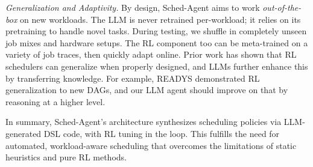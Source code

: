 \emph{Generalization and Adaptivity.} By design, Sched-Agent aims to work \emph{out-of-the-box} on new workloads. The LLM is never retrained per-workload; it relies on its pretraining to handle novel tasks. During testing, we shuffle in completely unseen job mixes and hardware setups. The RL component too can be meta-trained on a variety of job traces, then quickly adapt online. Prior work has shown that RL schedulers can generalize when properly designed, and LLMs further enhance this by transferring knowledge. For example, READYS demonstrated RL generalization to new DAGs, and our LLM agent should improve on that by reasoning at a higher level.

In summary, Sched-Agent's architecture synthesizes scheduling policies via LLM-generated DSL code, with RL tuning in the loop. This fulfills the need for automated, workload-aware scheduling that overcomes the limitations of static heuristics and pure RL methods.